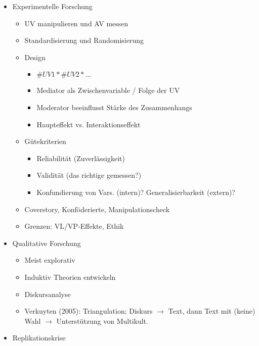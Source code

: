 \documentclass[11pt, paper=a4, twocolumn]{scrartcl}
\begin{document}
\begin{itemize}
			\item Experimentelle Forschung
				\begin{itemize}
					\item UV manipulieren und AV messen
					\item Standardisierung und Randomisierung
					\item Design
						\begin{itemize}
							\item $\#UV1 * \#UV2 * \dots$
							\item Mediator als Zwischenvariable / Folge der UV
							\item Moderator beeinflusst Stärke des Zusammenhangs
							\item Haupteffekt vs. Interaktionseffekt
						\end{itemize}
					\item Gütekriterien
						\begin{itemize}
							\item Reliabilität (Zuverlässigkeit)
							\item Validität (das richtige gemessen?)
							\item Konfundierung von Vars. (intern)? Generalisierbarkeit (extern)?
						\end{itemize}
					\item Coverstory, Konföderierte, Manipulationscheck
					\item Grenzen: VL/VP-Effekte, Ethik
				\end{itemize}

			\item Qualitative Forschung
				\begin{itemize}
					\item Meist explorativ
					\item Induktiv Theorien entwickeln
					\item Diskursanalyse
					\item Verkuyten (2005): Triangulation; Diskurs $\rightarrow$ Text, dann Text mit (keine) Wahl $\rightarrow$ 
						Unterstützung von Multikult.
				\end{itemize}

			\item Replikationskrise
		\end{itemize}
\end{document}
